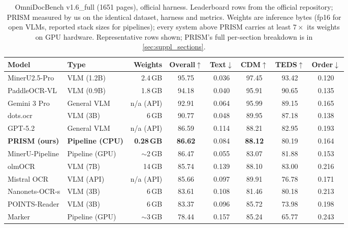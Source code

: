 \begin{table}[t]
\centering
\caption{OmniDocBench v1.6\_full (1651 pages), official harness. Leaderboard rows from the official repository; PRISM measured by us on the identical dataset, harness and metrics. Weights are inference bytes (fp16 for open VLMs, reported stack sizes for pipelines); every system above PRISM carries at least $7\times$ its weights on GPU hardware. Representative rows shown; PRISM's full per-section breakdown is in \cref{sec:suppl_sections}.}
\label{tab:v16}
\small
\setlength{\tabcolsep}{3.5pt}
\begin{tabular}{llrccccc}
\toprule
Model & Type & Weights & Overall$\uparrow$ & Text$\downarrow$ & CDM$\uparrow$ & TEDS$\uparrow$ & Order$\downarrow$ \\
\midrule
MinerU2.5-Pro & VLM (1.2B) & 2.4\,GB & 95.75 & 0.036 & 97.45 & 93.42 & 0.120 \\
PaddleOCR-VL & VLM (0.9B) & 1.8\,GB & 94.18 & 0.040 & 95.91 & 90.65 & 0.135 \\
Gemini 3 Pro & General VLM & n/a (API) & 92.91 & 0.064 & 95.99 & 89.15 & 0.165 \\
dots.ocr & VLM (3B) & 6\,GB & 90.77 & 0.048 & 89.95 & 87.18 & 0.138 \\
GPT-5.2 & General VLM & n/a (API) & 86.59 & 0.114 & 88.21 & 82.95 & 0.193 \\
\textbf{PRISM (ours)} & \textbf{Pipeline (CPU)} & \textbf{0.28\,GB} & \textbf{86.62} & 0.084 & \textbf{88.12} & 80.19 & 0.164 \\
MinerU-Pipeline & Pipeline (GPU) & $\sim$2\,GB & 86.47 & 0.055 & 83.07 & 81.88 & 0.153 \\
olmOCR & VLM (7B) & 14\,GB & 85.74 & 0.139 & 88.10 & 83.00 & 0.216 \\
Mistral OCR & VLM (API) & n/a (API) & 85.66 & 0.097 & 89.91 & 76.78 & 0.171 \\
Nanonets-OCR-s & VLM (3B) & 6\,GB & 83.61 & 0.108 & 81.46 & 80.18 & 0.213 \\
POINTS-Reader & VLM (3B) & 6\,GB & 83.37 & 0.096 & 85.72 & 73.98 & 0.198 \\
Marker & Pipeline (GPU) & $\sim$3\,GB & 78.44 & 0.157 & 85.24 & 65.77 & 0.243 \\
\bottomrule
\end{tabular}
\end{table}

